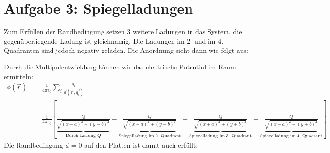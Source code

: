 \documentclass[11pt a4paper]{article}
\newcommand{\epsz}{\epsilon_0}
\newcommand{\kco}{\frac{1}{4\pi\epsilon_0}}
\begin{document}
	


\newpage
\section*{Aufgabe 3: Spiegelladungen}
Zum Erfüllen der Randbedingung setzen 3 weitere Ladungen in das System,
die gegenüberliegende Ladung ist gleichnamig. Die Ladungen im 2. und im 4.
Quadranten sind jedoch negativ geladen. Die Anordnung sieht dann wie folgt
aus:
\newline
\begin{center}
\end{center}
Durch die Multipolentwicklung können wir das elektrische Potential im Raum ermitteln:
\begin{align*}
	\phi (\vec r)
	&= \frac1{4\pi\epsz} \sum_i \frac{q_i}{d(\vec r, \vec{q_i})} \\
	&= \kco \left[
		\underbrace{\frac{Q}{\sqrt{(x-a)^2 + (y-b)^2}}}_{
			\text{Durch Ladung } Q}
		- \underbrace{\frac{Q}{\sqrt{(x+a)^2 + (y-b)^2}} }_{
			\text{Spiegelladung im 2. Quadrant}}
		+ \underbrace{\frac{Q}{\sqrt{(x + a)^2 + (y+b)^2}} }_{
			\text{Spiegelladung im 3. Quadrant}}
		- \underbrace{\frac{Q}{\sqrt{(x-a)^2 + (y+b)^2}} }_{
			\text{Spiegelladung im 4. Quadrant}}
	\right]
\end{align*}
Die Randbedingung $\phi = 0$ auf den Platten ist damit auch erfüllt:
\end{document}

